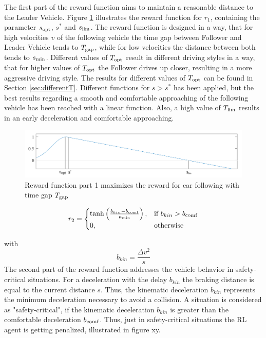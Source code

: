 \documentclass[review]{elsarticle}
\begin{document}
The first part of the reward function aims to maintain a reasonable distance to the Leader Vehicle. Figure \ref{fig:RewardFunc1} illustrates the reward function for $r_1$, containing the parameter $s_{\rm opt}$, $s^*$ and $s_{\rm lim}$. The reward function is designed in a way, that for high velocities $v$ of the following vehicle the time gap between Follower and Leader Vehicle tends to $T_{\rm gap}$, while for low velocities the distance between both tends to $s_{\rm min}$. Different values of $T_{\rm opt}$ result in different driving styles in a way, that for higher values of $T_{\rm opt}$ the Follower drives up closer, resulting in a more aggressive driving style. The results for different values of $T_{\rm opt}$ can be found in Section \ref{sec:differentT}. Different functions for $ s > s^*$ has been applied, but the best results regarding a smooth and comfortable approaching of the following vehicle has been reached with a linear function. Also, a high value of $T_{\rm lim}$ results in an early deceleration and comfortable approaching. 

\begin{figure}
	\centering
	\includegraphics[width=12cm]{images/RewardFunc1}
	\caption{Reward function part 1 maximizes the reward for car following with time gap $T_{\rm gap}$}
	\label{fig:RewardFunc1}
\end{figure}


\begin{equation}
r_2 = 
\begin{cases}
\tanh\left(\frac{b_{kin}-b_{\rm comf}}{a_{\rm min}}\right),& \text{if } b_{kin}>b_{\rm comf}\\
0,              & \text{otherwise}
\end{cases}
\end{equation}

with
\begin{equation}
b_{kin} = \frac{\Delta v^2}{s}
\end{equation}
The second part of the reward function addresses the vehicle behavior in safety-critical situations.
For a deceleration with the delay $b_{kin}$ the braking distance is equal to the current distance $s$. Thus, the kinematic deceleration $b_{kin}$ represents the minimum deceleration necessary to avoid a collision. A situation is considered as "safety-critical", if the kinematic deceleration $b_{kin}$ is greater than the comfortable deceleration $b_{\rm comf}$. Thus, just in safety-critical situations the RL agent is getting penalized, illustrated in figure xy.
\end{document}
